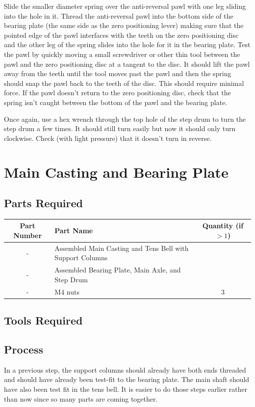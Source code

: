 \documentclass[openany]{book}
\begin{document}
Slide the smaller diameter spring over the anti-reversal pawl with one leg sliding into the hole in it. Thread the anti-reversal pawl into the bottom side of the bearing plate (the same side as the zero positioning lever) making sure that the pointed edge of the pawl interfaces with the teeth on the zero positioning disc and the other leg of the spring slides into the hole for it in the bearing plate. Test the pawl by quickly moving a small screwdriver or other thin tool between the pawl and the zero positioning disc at a tangent to the disc. It should lift the pawl away from the teeth until the tool moves past the pawl and then the spring should snap the pawl back to the teeth of the disc. This should require minimal force. If the pawl doesn’t return to the zero positioning disc, check that the spring isn’t caught between the bottom of the pawl and the bearing plate. 

Once again, use a hex wrench through the top hole of the step drum to turn the step drum a few times. It should still turn easily but now it should only turn clockwise. Check (with light pressure) that it doesn’t turn in reverse.



\chapter{Main Casting and Bearing Plate}
\section{Parts Required}
\begin{table}[!ht]
	\centering
	\begin{tabular}{clc}
		Part Number & Part Name & Quantity (if $>1$) \\ \hline
		- & Assembled Main Casting and Tens Bell with Support Columns & \\
		- & Assembled Bearing Plate, Main Axle, and Step Drum & \\ \hline \hline
		- & M4 nuts & 3
	\end{tabular}
\end{table}



\section{Tools Required}

\section{Process}
In a previous step, the support columns should already have both ends threaded and should have already been test-fit to the bearing plate. The main shaft should have also been test fit in the tens bell. It is easier to do those steps earlier rather than now since so many parts are coming together.
\end{document}
